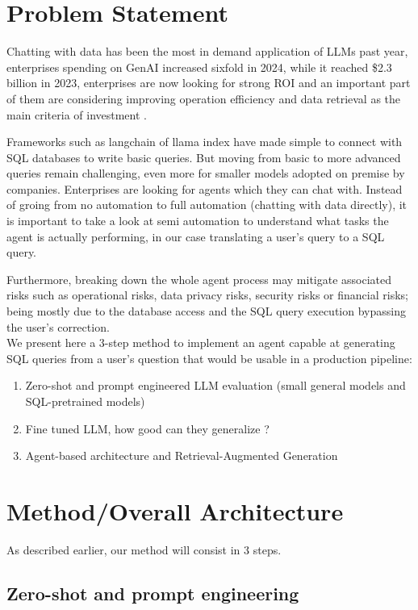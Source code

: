 \documentclass[12pt,a4paper]{article}
\begin{document}
\section*{Problem Statement}

Chatting with data has been the most in demand application of LLMs past year, enterprises spending on GenAI increased sixfold in 2024, while it reached \$2.3 billion in 2023, enterprises are now looking for strong ROI and an important part of them are considering improving operation efficiency and data retrieval as the main criteria of investment \cite{MarketAnalysis} \cite{DeloitteResearch}.

Frameworks such as langchain of llama index have made simple to connect with SQL databases to write basic queries. But moving from basic to more advanced queries remain challenging, even more for smaller models adopted on premise by companies. Enterprises are looking for agents which they can chat with. Instead of groing from no automation to full automation (chatting with data directly), it is important to take a look at semi automation to understand what tasks the agent is actually performing, in our case translating a user's query to a SQL query.

Furthermore, breaking down the whole agent process may mitigate associated risks such as operational risks, data privacy risks, security risks or financial risks; being mostly due to the database access and the SQL query execution bypassing the user's correction.
\\

We present here a 3-step method to implement an agent capable at generating SQL queries from a user's question that would be usable in a production pipeline:
\begin{enumerate}
    \item Zero-shot and prompt engineered LLM evaluation (small general models and SQL-pretrained models)
    \item Fine tuned LLM, how good can they generalize ?
    \item Agent-based architecture and Retrieval-Augmented Generation
\end{enumerate}


\section*{Method/Overall Architecture}

As described earlier, our method will consist in 3 steps.
\subsection*{Zero-shot and prompt engineering}
\end{document}
